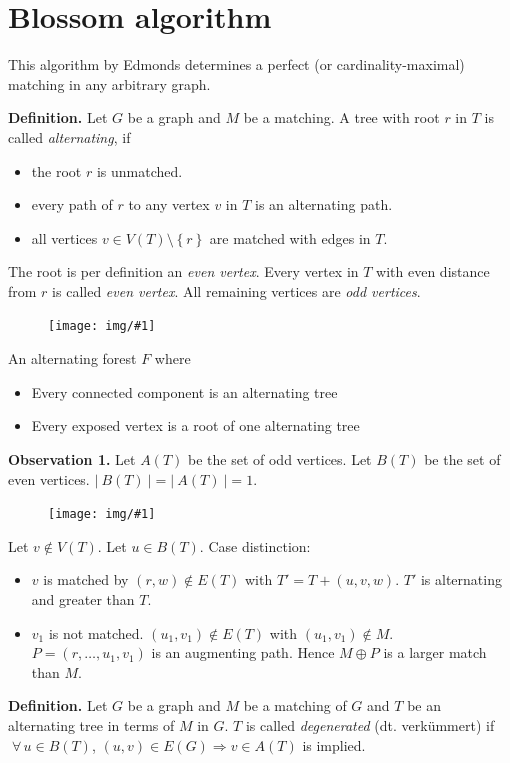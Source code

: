 \documentclass{article}
\newcommand{\drawing}[1]{%
 \begin{figure}[t]
  \begin{center}
   \texttt{[image: img/\#1]}
  \end{center}
 \end{figure}
}
\newcommand{\card}[1]{\left|\:\!#1\:\!\right|}
\newcommand{\set}[1]{\left\{#1\right\}}
\newcommand{\fall}{\;\forall\,}
\begin{document}
\section{Blossom algorithm}
%
This algorithm by Edmonds determines a perfect (or cardinality-maximal) matching in any arbitrary graph.

\textbf{Definition.}
  Let $G$ be a graph and $M$ be a matching.
  A tree with root $r$ in $T$ is called \emph{alternating}, if
  \begin{itemize}
    \item the root $r$ is unmatched.
    \item every path of $r$ to any vertex $v$ in $T$ is an alternating path.
    \item all vertices $v \in V(T) \setminus \set{r}$ are matched with edges in $T$.
  \end{itemize}
  The root is per definition an \emph{even vertex}.
  Every vertex in $T$ with even distance from $r$ is called \emph{even vertex}.
  All remaining vertices are \emph{odd vertices}.

  \drawing{alternating_tree.pdf}

  An alternating forest $F$ where
  \begin{itemize}
    \item Every connected component is an alternating tree
    \item Every exposed vertex is a root of one alternating tree
  \end{itemize}

\textbf{Observation 1.}
  Let $A(T)$ be the set of odd vertices.
  Let $B(T)$ be the set of even vertices.
  $\card{B(T)} = \card{A(T)} = 1$.

  \drawing{alernating_paths_observation_1.pdf}

  Let $v \notin V(T)$. Let $u \in B(T)$. Case distinction:
  \begin{itemize}
    \item $v$ is matched by $(r,w) \notin E(T)$ with $T' = T + (u, v, w)$.
      $T'$ is alternating and greater than $T$.
    \item $v_1$ is not matched. $(u_1, v_1) \notin E(T)$ with $(u_1, v_1) \notin M$.
      $P = (r, \ldots, u_1, v_1)$ is an augmenting path. Hence $M \oplus P$ is a larger match than $M$.
  \end{itemize}

\textbf{Definition.}
  Let $G$ be a graph and $M$ be a matching of $G$ and $T$ be an alternating tree in terms of $M$ in $G$.
  $T$ is called \emph{degenerated} (dt. verkümmert) if $\fall u \in B(T)$, $(u, v) \in E(G) \Rightarrow v \in A(T)$ is implied.
\end{document}
